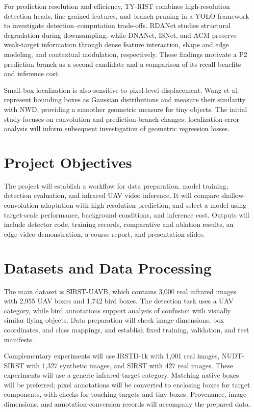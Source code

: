 For prediction resolution and efficiency, TY-RIST combines high-resolution detection heads, fine-grained features, and branch pruning in a YOLO framework to investigate detection--computation trade-offs\cite{atrash2025tyrist}. RDANet studies structural degradation during downsampling, while DNANet, ISNet, and ACM preserve weak-target information through dense feature interaction, shape and edge modeling, and contextual modulation, respectively\cite{liu2026rdanet,li2023dnanet,zhang2022isnet,dai2021acm}. These findings motivate a P2 prediction branch as a second candidate and a comparison of its recall benefits and inference cost.

Small-box localization is also sensitive to pixel-level displacement. Wang et al. represent bounding boxes as Gaussian distributions and measure their similarity with NWD, providing a smoother geometric measure for tiny objects\cite{wang2021nwd}. The initial study focuses on convolution and prediction-branch changes; localization-error analysis will inform subsequent investigation of geometric regression losses.

\IEEEpubidadjcol

\section{Project Objectives}
The project will establish a workflow for data preparation, model training, detection evaluation, and infrared UAV video inference. It will compare shallow-convolution adaptation with high-resolution prediction, and select a model using target-scale performance, background conditions, and inference cost. Outputs will include detector code, training records, comparative and ablation results, an edge-video demonstration, a course report, and presentation slides.

\section{Datasets and Data Processing}
The main dataset is SIRST-UAVB, which contains 3,000 real infrared images with 2,955 UAV boxes and 1,742 bird boxes\cite{yang2025pconv}. The detection task uses a UAV category, while bird annotations support analysis of confusion with visually similar flying objects. Data preparation will check image dimensions, box coordinates, and class mappings, and establish fixed training, validation, and test manifests.

Complementary experiments will use IRSTD-1k with 1,001 real images, NUDT-SIRST with 1,327 synthetic images, and SIRST with 427 real images\cite{zhang2022isnet,li2023dnanet,dai2021acm}. These experiments will use a generic infrared-target category. Matching native boxes will be preferred; pixel annotations will be converted to enclosing boxes for target components, with checks for touching targets and tiny boxes. Provenance, image dimensions, and annotation-conversion records will accompany the prepared data.

